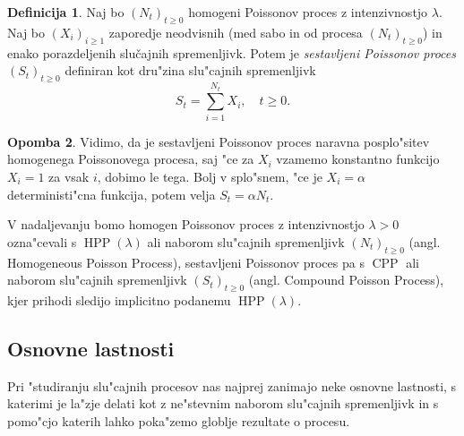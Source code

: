\documentclass[12pt, a4paper, reqno]{amsart}
\theoremstyle{definition}
\newtheorem{definicija}{Definicija}[section]
\newtheorem{opomba}[definicija]{Opomba}
\theoremstyle{plain}
\newcommand{\1}{\mathds{1}}
\DeclareMathOperator{\HPP}{HPP}
\DeclareMathOperator{\CPP}{CPP}
\begin{document}
    \begin{definicija}
        Naj bo $(N_t)_{t\geq0}$ homogeni Poissonov proces z intenzivnostjo $\lambda$. 
        Naj bo $(X_i)_{i\geq1}$ zaporedje neodvisnih (med sabo in od procesa $(N_t)_{t\geq0}$) in enako 
        porazdeljenih slučajnih spremenljivk. Potem je 
        \textit{sestavljeni Poissonov proces} $(S_t)_{t\geq0}$ definiran kot dru"zina
        slu"cajnih spremenljivk
        $$
            S_t = \sum_{i=1}^{N_t} X_i, \quad t\geq0.
        $$
        \label{def:CPP}
    \end{definicija}

    \begin{opomba}
        Vidimo, da je sestavljeni Poissonov proces naravna posplo"sitev homogenega Poissonovega procesa, saj "ce za
        $X_i$ vzamemo konstantno funkcijo $X_i = 1$ za vsak $i$, dobimo le tega. Bolj v splo"snem, "ce je 
        $X_i = \alpha$ deterministi"cna funkcija, potem velja $S_t = \alpha N_t$.
        \label{op:CPPHPPPovezava}
    \end{opomba}

    V nadaljevanju bomo homogen Poissonov proces z intenzivnostjo $\lambda >0$ ozna"cevali s $\HPP(\lambda)$ 
    ali naborom slu"cajnih spremenljivk $(N_t)_{t\geq0}$ (angl. Homogeneous Poisson Process), 
    sestavljeni Poissonov proces pa s $\CPP$ ali naborom slu"cajnih spremenljivk $(S_t)_{t\geq0}$ 
    (angl. Compound Poisson Process), kjer prihodi sledijo implicitno podanemu $\HPP(\lambda)$. 

    \subsection{Osnovne lastnosti}
    
        Pri "studiranju slu"cajnih procesov nas najprej zanimajo neke osnovne lastnosti, s katerimi 
        je la"zje delati kot z ne"stevnim naborom slu"cajnih spremenljivk in s pomo"cjo katerih 
        lahko poka"zemo globlje rezultate o procesu. 
\end{document}
